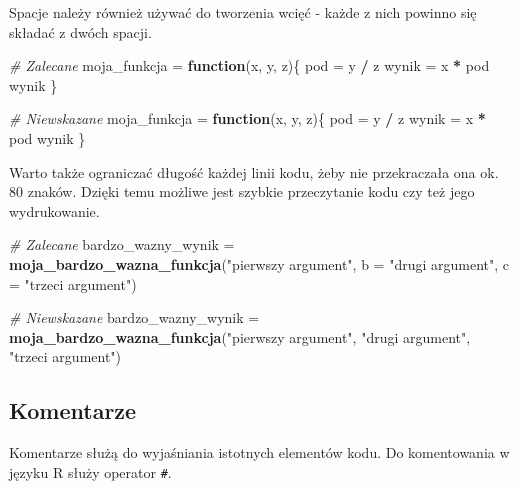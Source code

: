 \documentclass[paper=6in:9in,pagesize=pdftex,headinclude=on,footinclude=on,10pt]{scrbook}
\newenvironment{Shaded}{\begin{snugshade}}{\end{snugshade}}
\newcommand{\CommentTok}[1]{\textcolor[rgb]{0.56,0.35,0.01}{\textit{#1}}}
\newcommand{\ControlFlowTok}[1]{\textcolor[rgb]{0.13,0.29,0.53}{\textbf{#1}}}
\newcommand{\DataTypeTok}[1]{\textcolor[rgb]{0.13,0.29,0.53}{#1}}
\newcommand{\KeywordTok}[1]{\textcolor[rgb]{0.13,0.29,0.53}{\textbf{#1}}}
\newcommand{\NormalTok}[1]{#1}
\newcommand{\OperatorTok}[1]{\textcolor[rgb]{0.81,0.36,0.00}{\textbf{#1}}}
\newcommand{\StringTok}[1]{\textcolor[rgb]{0.31,0.60,0.02}{#1}}
\begin{document}
Spacje należy również używać do tworzenia wcięć - każde z nich powinno się składać z dwóch spacji.

\begin{Shaded}
\begin{Highlighting}[]
\CommentTok{# Zalecane}
\NormalTok{moja_funkcja =}\StringTok{ }\ControlFlowTok{function}\NormalTok{(x, y, z)\{}
\NormalTok{  pod =}\StringTok{ }\NormalTok{y }\OperatorTok{/}\StringTok{ }\NormalTok{z}
\NormalTok{  wynik =}\StringTok{ }\NormalTok{x }\OperatorTok{*}\StringTok{ }\NormalTok{pod}
\NormalTok{  wynik}
\NormalTok{\}}

\CommentTok{# Niewskazane}
\NormalTok{moja_funkcja =}\StringTok{ }\ControlFlowTok{function}\NormalTok{(x, y, z)\{}
\NormalTok{pod =}\StringTok{ }\NormalTok{y }\OperatorTok{/}\StringTok{ }\NormalTok{z}
\NormalTok{wynik =}\StringTok{ }\NormalTok{x }\OperatorTok{*}\StringTok{ }\NormalTok{pod}
\NormalTok{wynik}
\NormalTok{\}}
\end{Highlighting}
\end{Shaded}

Warto także ograniczać długość każdej linii kodu, żeby nie przekraczała ona ok. 80 znaków.
Dzięki temu możliwe jest szybkie przeczytanie kodu czy też jego wydrukowanie.

\begin{Shaded}
\begin{Highlighting}[]
\CommentTok{# Zalecane}
\NormalTok{bardzo_wazny_wynik =}\StringTok{ }\KeywordTok{moja_bardzo_wazna_funkcja}\NormalTok{(}\StringTok{"pierwszy argument"}\NormalTok{,}
                                               \DataTypeTok{b =} \StringTok{"drugi argument"}\NormalTok{, }
                                               \DataTypeTok{c =} \StringTok{"trzeci argument"}\NormalTok{)}

\CommentTok{# Niewskazane}
\NormalTok{bardzo_wazny_wynik =}\StringTok{ }\KeywordTok{moja_bardzo_wazna_funkcja}\NormalTok{(}\StringTok{"pierwszy argument"}\NormalTok{, }\StringTok{"drugi argument"}\NormalTok{, }\StringTok{"trzeci argument"}\NormalTok{)}
\end{Highlighting}
\end{Shaded}

\hypertarget{komentarze}{%
\subsection{Komentarze}\label{komentarze}}

Komentarze służą do wyjaśniania istotnych elementów kodu.
Do komentowania w języku R służy operator \texttt{\#}.
\end{document}
